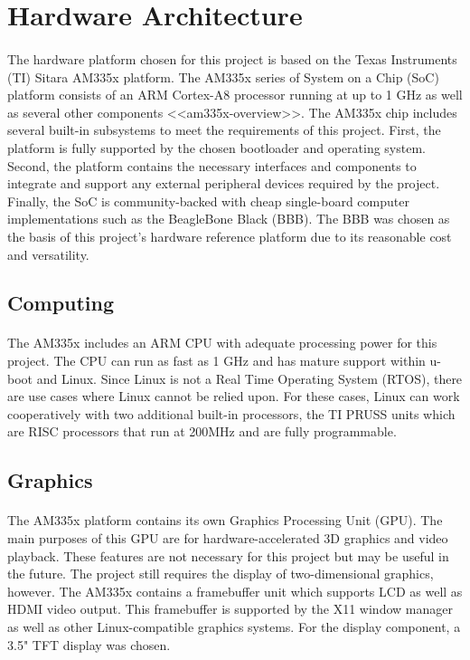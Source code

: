 \section{Hardware Architecture}

\paragraph{}
The hardware platform chosen for this project is based on the Texas Instruments (TI) Sitara AM335x platform.
The AM335x series of System on a Chip (SoC) platform consists of an ARM Cortex-A8 processor running at up to 1 GHz as well as several other components <<am335x-overview>>.
The AM335x chip includes several built-in subsystems to meet the requirements of this project.
First, the platform is fully supported by the chosen bootloader and operating system.
Second, the platform contains the necessary interfaces and components to integrate and support any external peripheral devices required by the project.
Finally, the SoC is community-backed with cheap single-board computer implementations such as the BeagleBone Black (BBB).
The BBB was chosen as the basis of this project's hardware reference platform due to its reasonable cost and versatility.

\subsection{Computing}

\paragraph{}
The AM335x includes an ARM CPU with adequate processing power for this project.
The CPU can run as fast as 1 GHz and has mature support within u-boot and Linux.
Since Linux is not a Real Time Operating System (RTOS), there are use cases where Linux cannot be relied upon.
For these cases, Linux can work cooperatively with two additional built-in processors, the TI PRUSS units which are RISC processors that run at 200MHz and are fully programmable.

\subsection{Graphics}

\paragraph{}
The AM335x platform contains its own Graphics Processing Unit (GPU).
The main purposes of this GPU are for hardware-accelerated 3D graphics and video playback.
These features are not necessary for this project but may be useful in the future.
The project still requires the display of two-dimensional graphics, however.
The AM335x contains a framebuffer unit which supports LCD as well as HDMI video output.
This framebuffer is supported by the X11 window manager as well as other Linux-compatible graphics systems.
For the display component, a 3.5" TFT display was chosen.

